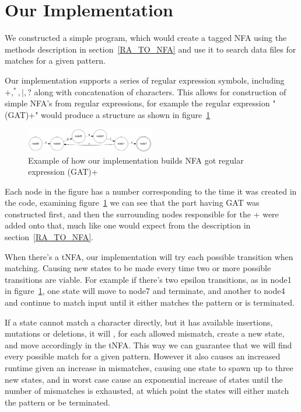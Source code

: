 \section{Our Implementation}
We constructed  a simple program, which would create a tagged NFA using the methods description in section~\ref{RA_TO_NFA} and use it to search data files for matches for a given pattern.

Our implementation supports a series of regular expression symbols, including $+, ^*, |, ?$ along with concatenation of characters. This allows for construction of simple NFA's from regular expressions, for example the regular expression "(GAT)+" would produce a structure as shown in figure~\ref{fig:gat}

\begin{figure}[h!]
\centering
\includegraphics[width=0.5\textwidth]{lib/gat.png}
\caption{Example of how our implementation builds NFA got regular expression (GAT)+}
\label{fig:gat}
\end{figure}

Each node in the figure has a number corresponding to the time it was created in the code, examining figure~\ref{fig:gat} we can see that the part having GAT was constructed first, and then the surrounding nodes responsible for the $+$ were added onto that, much like one would expect from the description in section~\ref{RA_TO_NFA}.

When there's a tNFA, our implementation will try each possible transition when matching. Causing new states to be made every time two or more possible transitions are viable. For example if there's two epsilon transitions, as in node1 in figure~\ref{fig:gat}, one state will move to node7 and terminate, and another to node4 and continue to match input until it either matches the pattern or is terminated.

If a state cannot match a character directly, but it has available insertions, mutations or deletions, it will , for each allowed mismatch,  create a new state, and move accordingly in the tNFA. This way we can guarantee that we will find every possible match for a given pattern. However it also causes an increased runtime given an increase in mismatches, causing one state to spawn up to three new states, and in worst case cause an exponential increase of states until the number of mismatches is exhausted, at which point the states will either match the pattern or be terminated.


